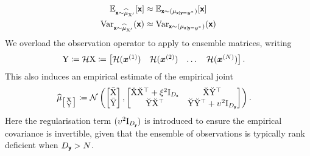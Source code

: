 \documentclass[wcp]{jmlr} %
\begin{document}
\begin{align}
    \Ex_{\vrv{x}\sim \ELaw[\mm{X}']}[ \vrv{x}] &\approx \Ex_{\vrv{x}\sim (\Law[\vrv{x} \gvn \vrv{y}=\vv{y}^*])} [\vrv{x}]\\
    \var_{\vrv{x}\sim \ELaw[\mm{X}']} (\vrv{x}) &\approx \var_{\vrv{x}\sim (\Law[\vrv{x} \gvn \vrv{y}=\vv{y}^*])} (\vrv{x})
\end{align}
We overload the observation operator to apply to ensemble matrices, writing
\begin{align}
    \mathrm{Y}\coloneq\mathcal{H}\mathrm{X} &\coloneq \begin{bmatrix}\mathcal{H}(\boldsymbol{x}^{(1)}) & \mathcal{H}(\boldsymbol{x}^{(2)})& \dots& \mathcal{H}(\boldsymbol{x}^{(N)})\end{bmatrix}.
\end{align}
This also induces an empirical estimate of the %
 empirical joint
\begin{align}
    \ELaw[{\left[\begin{smallmatrix}
        \mm{X}\\
        \mm{Y}
    \end{smallmatrix}\right]}] &\coloneq \Normal\left(\begin{bmatrix}
        \mmmean{X}\\
        \mmmean{Y}
    \end{bmatrix},
    \begin{bmatrix}
        \mmdev{X} \mmdev{X}^\top + \xi^2\mm{I}_{D_{\vrv{x}}} & \mmdev{X} \mmdev{Y}^\top \\
        \mmdev{Y} \mmdev{X}^\top  & \mmdev{Y} \mmdev{Y}^\top + \upsilon^2\mm{I}_{D_{\vrv{y}}}
    \end{bmatrix}
    \right).\label{eq:ensemble-joint}
\end{align}
Here the regularisation term \((\upsilon^2\mathrm{I}_{D_{\boldsymbol{\mathsf{y}}}})\) is introduced to ensure the empirical covariance is invertible, given that the ensemble of observations is typically rank deficient when \(D_{\boldsymbol{\mathsf{y}}}>N\).
\end{document}
